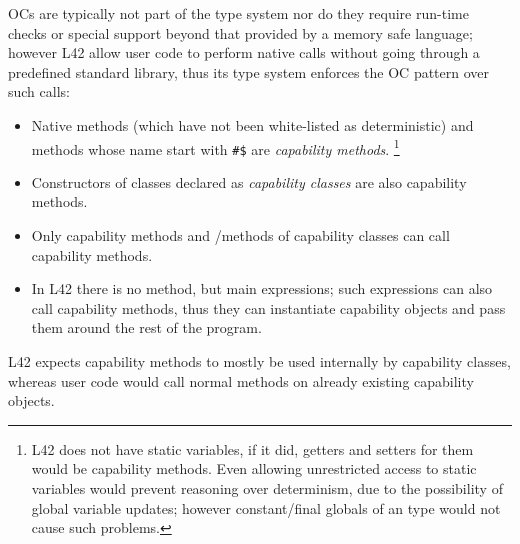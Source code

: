 OCs are typically not part of the type system nor do they require run-time checks or special support beyond that provided by a memory safe language; however
L42 allow user code to perform native calls without going through a predefined standard library, thus its type system enforces the OC pattern over such calls:
\begin{itemize}
\item Native methods (which have not been white-listed as deterministic) and methods whose name start with \texttt{\#\$} are \emph{capability methods}.%
\footnote{
L42 does not have static variables, if it did, getters and setters for them would be capability methods.
Even allowing unrestricted access to \Q@imm@
static variables would prevent reasoning over
determinism, due to the possibility of global variable
updates; however constant/final globals of an 
\Q@imm@ type would not cause such problems.
}
\item Constructors of classes declared as \emph{capability classes} are also capability methods.
\item Only capability methods and \Q@mut@/\Q@capsule@ methods of capability classes can call capability methods.
\item In L42 there is no \Q@main@ method, but main expressions; such expressions can also call capability methods, thus they can instantiate capability objects and pass them around the rest of the program.

\end{itemize}
L42 expects capability methods to mostly be used internally by capability classes, whereas user code would call normal methods on already existing capability objects.

